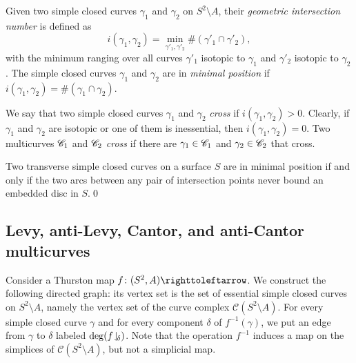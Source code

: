 \documentclass{amsart}
\begin{document}
Given two simple closed curves $\gamma_1$ and $\gamma_2$ on
$S^2\setminus A$, their \emph{geometric intersection number} is
defined as
\[i(\gamma_1,\gamma_2)=\min_{\gamma'_1,\gamma'_2}\#(\gamma'_1\cap\gamma'_2),
\]
with the minimum ranging over all curves $\gamma'_1$ isotopic to
$\gamma_1$ and $\gamma'_2$ isotopic to $\gamma_2$.  The simple closed
curves $\gamma_1$ and $\gamma_2$ are in \emph{minimal position} if
$i(\gamma_1,\gamma_2)=\#(\gamma_1\cap \gamma_2)$.

We say that two simple closed curves $\gamma_1$ and $\gamma_2$
\emph{cross} if $i(\gamma_1,\gamma_2)>0$. Clearly, if $\gamma_1$ and
$\gamma_2$ are isotopic or one of them is inessential, then
$i(\gamma_1,\gamma_2)=0$. Two multicurves ${\mathscr C}_1$ and ${\mathscr C}_2$
\emph{cross} if there are $\gamma_1\in {\mathscr C}_1$ and $\gamma_2\in {\mathscr C}_2$
that cross.

\begin{prop}\label{prop:BigonCriterion}
  Two transverse simple closed curves on a surface $S$ are in minimal
  position if and only if the two arcs between any pair of
  intersection points never bound an embedded disc in $S$.\qed
\end{prop}

\subsection{Levy, anti-Levy, Cantor, and anti-Cantor multicurves}
Consider a Thurston map $f\colon(S^2,A)\selfmap$. We construct the
following directed graph: its vertex set is the set of essential
simple closed curves on $S^2\setminus A$, namely the vertex set of the
curve complex $\mathcal C(S^2\setminus A)$. For every simple closed
curve $\gamma$ and for every component $\delta$ of $f^{-1}(\gamma)$,
we put an edge from $\gamma$ to $\delta$ labeled
$\deg(f\!\downharpoonleft_{\!\delta})$. Note that the operation $f^{-1}$ induces a
map on the simplices of $\mathcal C(S^2\setminus A)$, but not a
simplicial map.
\end{document}
